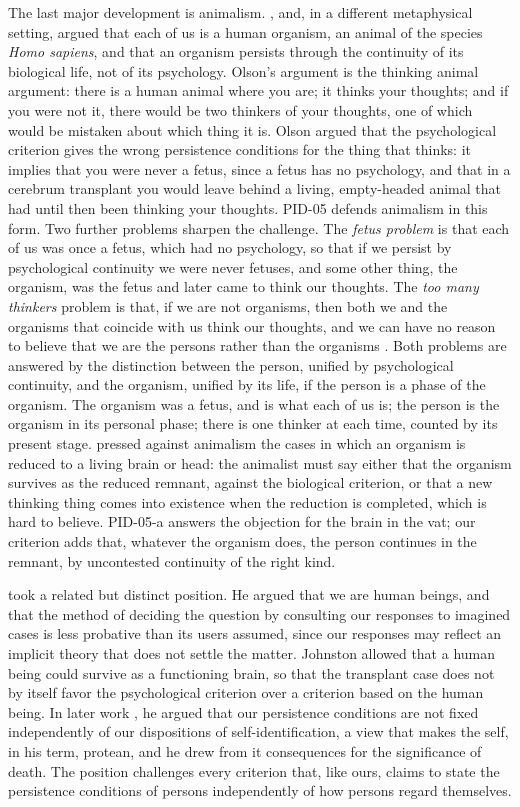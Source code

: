 \documentclass{situationist-preprint}
\begin{document}
The last major development is animalism. \citet{Snowdon1990}, \citet{Olson1997,Olson2007} and, in a different metaphysical setting, \citet{vanInwagen1990} argued that each of us is a human organism, an animal of the species \emph{Homo sapiens}, and that an organism persists through the continuity of its biological life, not of its psychology. Olson's argument is the thinking animal argument: there is a human animal where you are; it thinks your thoughts; and if you were not it, there would be two thinkers of your thoughts, one of which would be mistaken about which thing it is. Olson argued that the psychological criterion gives the wrong persistence conditions for the thing that thinks: it implies that you were never a fetus, since a fetus has no psychology, and that in a cerebrum transplant you would leave behind a living, empty-headed animal that had until then been thinking your thoughts. PID-05 defends animalism in this form. Two further problems sharpen the challenge. The \emph{fetus problem} is that each of us was once a fetus, which had no psychology, so that if we persist by psychological continuity we were never fetuses, and some other thing, the organism, was the fetus and later came to think our thoughts. The \emph{too many thinkers} problem is that, if we are not organisms, then both we and the organisms that coincide with us think our thoughts, and we can have no reason to believe that we are the persons rather than the organisms \citep{Olson2007}. Both problems are answered by the distinction between the person, unified by psychological continuity, and the organism, unified by its life, if the person is a phase of the organism. The organism was a fetus, and is what each of us is; the person is the organism in its personal phase; there is one thinker at each time, counted by its present stage. \citet{Johnston2007} pressed against animalism the cases in which an organism is reduced to a living brain or head: the animalist must say either that the organism survives as the reduced remnant, against the biological criterion, or that a new thinking thing comes into existence when the reduction is completed, which is hard to believe. PID-05-a answers the objection for the brain in the vat; our criterion adds that, whatever the organism does, the person continues in the remnant, by uncontested continuity of the right kind.

\citet{Johnston1987} took a related but distinct position. He argued that we are human beings, and that the method of deciding the question by consulting our responses to imagined cases is less probative than its users assumed, since our responses may reflect an implicit theory that does not settle the matter. Johnston allowed that a human being could survive as a functioning brain, so that the transplant case does not by itself favor the psychological criterion over a criterion based on the human being. In later work \citep{Johnston2010}, he argued that our persistence conditions are not fixed independently of our dispositions of self-identification, a view that makes the self, in his term, protean, and he drew from it consequences for the significance of death. The position challenges every criterion that, like ours, claims to state the persistence conditions of persons independently of how persons regard themselves.
\end{document}
